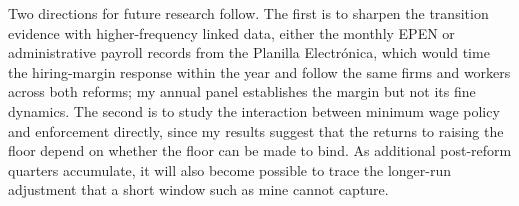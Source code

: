 Two directions for future research follow. The first is to sharpen the transition evidence with higher-frequency linked data, either the monthly EPEN or administrative payroll records from the Planilla Electrónica, which would time the hiring-margin response within the year and follow the same firms and workers across both reforms; my annual panel establishes the margin but not its fine dynamics. The second is to study the interaction between minimum wage policy and enforcement directly, since my results suggest that the returns to raising the floor depend on whether the floor can be made to bind. As additional post-reform quarters accumulate, it will also become possible to trace the longer-run adjustment that a short window such as mine cannot capture.
